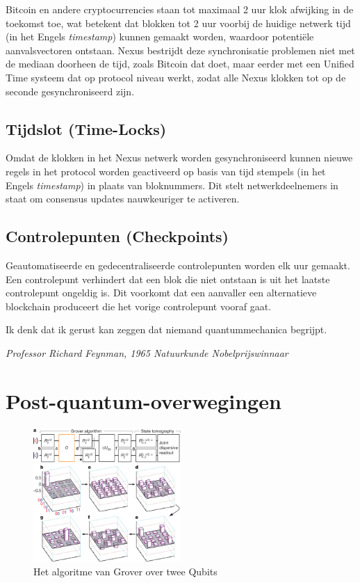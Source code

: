 \documentclass[11pt]{article}
\begin{document}
Bitcoin en andere cryptocurrencies staan tot maximaal 2 uur klok afwijking in de toekomst toe, wat betekent dat blokken tot 2 uur voorbij de huidige netwerk tijd (in het Engels \textit{timestamp}) kunnen gemaakt worden, waardoor potenti\"ele aanvalsvectoren ontstaan. 
Nexus bestrijdt deze synchronisatie problemen niet met de mediaan doorheen de tijd, zoals Bitcoin dat doet, maar eerder met een Unified Time systeem dat op protocol niveau werkt, zodat alle Nexus klokken tot op de seconde gesynchroniseerd zijn.

\subsection{Tijdslot (Time-Locks)}

Omdat de klokken in het Nexus netwerk worden gesynchroniseerd kunnen nieuwe regels in het protocol worden geactiveerd op basis van tijd stempels (in het Engels \textit{timestamp}) in plaats van bloknummers. Dit stelt netwerkdeelnemers in staat om consensus updates nauwkeuriger te activeren.


\subsection{Controlepunten (Checkpoints)}

Geautomatiseerde en gedecentraliseerde controlepunten worden elk uur gemaakt. Een controlepunt verhindert dat een blok die niet ontstaan is uit het laatste controlepunt ongeldig is. Dit voorkomt dat een aanvaller een alternatieve blockchain produceert die het vorige controlepunt vooraf gaat.

\bigskip
\epigraph{Ik denk dat ik gerust kan zeggen dat niemand quantummechanica	begrijpt.
}{\textit{\footnotesize{Professor Richard Feynman, 1965 Natuurkunde Nobelprijswinnaar \cite{nobelfeynman}}}}

\pagebreak
\section{Post-quantum-overwegingen}

\begin{figure} %
	\vspace{-15pt}
    \centering
    \includegraphics[width=0.50\textwidth]{grovers.jpg}
    \caption{Het algoritme van Grover over twee Qubits}
\end{figure}
\end{document}

